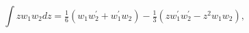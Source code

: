 \[\int zw_{1}w_{2}dz=\tfrac{1}{6}(w_{1}w^{\prime}_{2}+w^{\prime}_{1}w_{2})-%
\tfrac{1}{3}(zw^{\prime}_{1}w^{\prime}_{2}-z^{2}w_{1}w_{2}),\]